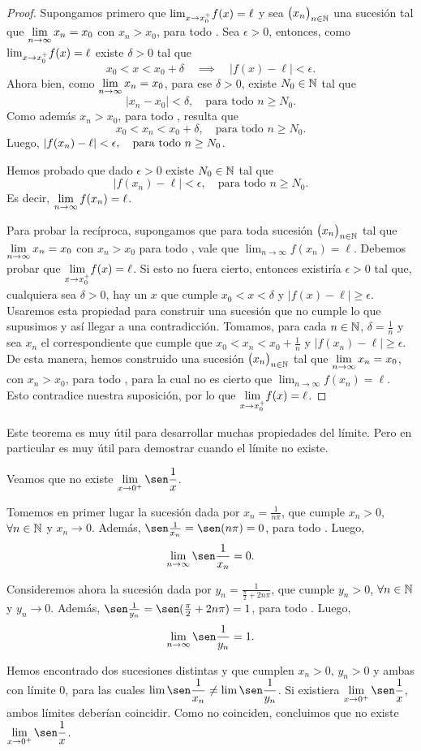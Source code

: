 \begin{proof}
Supongamos primero que ${\lim_{x\to x_0^+}} f(x)=\ell$ y sea $\big(x_n\big)_{n\in\mathbb{N}}$ una sucesión tal que $\displaystyle\lim_{n\to\infty} x_n = x_0$ con $x_n > x_0$, para todo \niN.
Sea $\epsilon>0$, entonces, como ${\lim_{x\to x_0^+}} f(x)=\ell$ existe $\delta>0$ tal que
\[
x_0< x <x_0+\delta\quad\implies\quad |f(x)-\ell|<\epsilon.
\]
Ahora bien, como $\displaystyle\lim_{n\to\infty} x_n = x_0$, para ese $\delta>0$, existe $N_0\in\mathbb{N}$ tal que
\[
|x_n-x_0|<\delta, \quad\text{para todo $n\ge N_0$}.
\]
Como además $x_n > x_0$, para todo \niN, resulta que 
\[
x_0 < x_n < x_0 + \delta, \quad\text{para todo $n\ge N_0$}.
\]
Luego, $\displaystyle |f(x_n)-\ell|<\epsilon, \quad\text{para todo $n\ge N_0$}$.

Hemos probado que dado $\epsilon>0$ existe $N_0\in\mathbb{N}$ tal que 
\[
|f(x_n)-\ell|<\epsilon, \quad\text{para todo $n\ge N_0$}.
\]
Es decir, $\displaystyle\lim_{n\to\infty}f(x_n) = \ell$.

Para probar la recíproca, supongamos que para toda sucesión $\big(x_n\big)_{n\in\mathbb{N}}$ tal que $\displaystyle\lim_{n\to\infty} x_n = x_0$ con $x_n > x_0$ para todo \niN, vale que $\lim_{n\to\infty}f(x_n)=\ell$.
Debemos probar que $\displaystyle{\ensuremath{\lim_{x\to x_0^+}}} f(x)=\ell$.
Si esto no fuera cierto, entonces existiría $\epsilon>0$ tal que, cualquiera sea $\delta>0$, hay un $x$ que cumple $x_0<x<\delta$ y $|f(x)-\ell|\ge \epsilon$.
Usaremos esta propiedad para construir una sucesión que no cumple lo que supusimos y así llegar a una contradicción.
Tomamos, para cada $n\in\mathbb{N}$, $\delta=\frac1n$ y sea $x_n$ el correspondiente que cumple que $x_0<x_n<x_0+\frac1n$ y $|f(x_n)-\ell|\ge \epsilon$.
De esta manera, hemos construido una sucesión $\big(x_n\big)_{n\in\mathbb{N}}$ tal que $\displaystyle\lim_{n\to\infty} x_n = x_0$, con $x_n> x_0$, para todo \niN, para la cual no es cierto que $\lim_{n\to\infty}f(x_n)=\ell$. Esto contradice nuestra suposición, por lo que $\displaystyle{\ensuremath{\lim_{x\to x_0^+}}} f(x)=\ell$.
\end{proof}

Este teorema es muy útil para desarrollar muchas propiedades del límite. Pero en particular es muy útil para demostrar cuando el límite no existe.


\begin{example}
    Veamos que no existe $\D\lim_{x\to 0^+} \sen \frac1x$.
    
    Tomemos en primer lugar la sucesión \sucxn dada por $ x_n = \frac{1}{n\pi}$, que cumple $x_n>0$, $\forall {\ensuremath{n\in\mathbb{N}}}$ y $x_n\to 0$. Además, $\sen\frac1{x_n}=\sen (n\pi) = 0$, para todo \niN. Luego, 
    \[ \lim_{n\to\infty} \sen \frac1{x_n} = 0. \]

    Consideremos ahora la sucesión \sucyn dada por $y_n = \frac{1}{\frac\pi2+2n\pi}$, que cumple $y_n>0$, $\forall {\ensuremath{n\in\mathbb{N}}}$ y $y_n\to 0$. 
    Además, $\sen\frac1{y_n}=\sen (\frac \pi2 + 2n\pi) = 1$, para todo \niN. Luego, 
    \[
    \lim_{n\to\infty} \sen \frac1{y_n} = 1.
    \]

    Hemos encontrado dos sucesiones distintas \sucxn y \sucyn que cumplen $x_n>0$, $y_n>0$ y ambas con límite $0$, para las cuales $\D\lim \sen\frac1{x_n}\neq\lim \sen\frac1{y_n}$. Si existiera $\D\lim_{x\to 0^+} \sen \frac1x$, ambos límites deberían coincidir. Como no coinciden, concluimos que no existe $\D\lim_{x\to 0^+} \sen \frac1x$.
\end{example}

